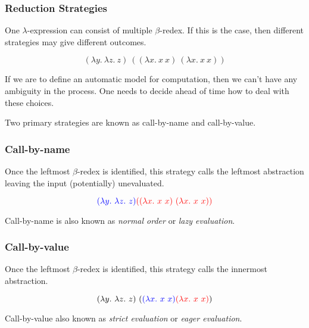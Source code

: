 \documentclass{beamer}
\begin{document}
\begin{frame}
	\frametitle{Reduction Strategies}

	One $\lambda$-expression can consist of multiple $\beta$-redex. If this is the case, then different strategies may give different outcomes. 

	$$(\lambda y. \ \lambda z. \ z) \ ((\lambda x. \ x \ x) \ (\lambda x. \ x \ x))$$

	\vspace{2cm}

	If we are to define an automatic model for computation, then we can't have any ambiguity in the process. One needs to decide ahead of time how to deal with these choices. 
	
	Two primary strategies are known as call-by-name and call-by-value.

\end{frame}

\begin{frame}
	\frametitle{Call-by-name}

	Once the leftmost $\beta$-redex is identified, this strategy calls the leftmost abstraction leaving the input (potentially) unevaluated.

	$$\lamabsarg{(\lambda y. \ \lambda z. \ z)}{((\lambda x. \ x \ x) \ (\lambda x. \ x \ x))}$$

	\vspace{45mm}
	
	Call-by-name is also known as \emph{normal order} or \emph{lazy evaluation}.

\end{frame}

\begin{frame}
	\frametitle{Call-by-value}

	Once the leftmost $\beta$-redex is identified, this strategy calls the innermost abstraction. 

	$$(\lambda y. \ \lambda z. \ z) \ (\lamabsarg{(\lambda x. \ x \ x)}{(\lambda x. \ x \ x)})$$

	\vspace{4.5cm}
	
	Call-by-value also known as \emph{strict evaluation} or \emph{eager evaluation}.

\end{frame}
\end{document}
